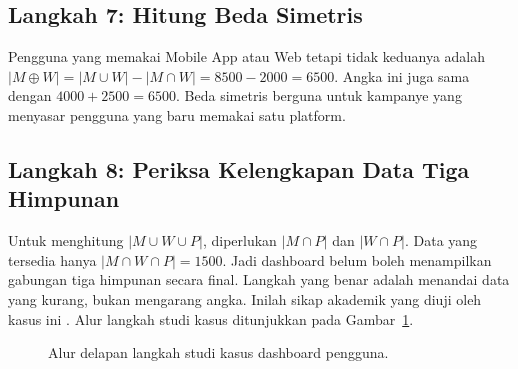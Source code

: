 \documentclass[11pt,a4paper]{article}
\begin{document}
\subsection{Langkah 7: Hitung Beda Simetris}

Pengguna yang memakai Mobile App atau Web tetapi tidak keduanya adalah $|M \oplus W|=|M \cup W|-|M \cap W|=8500-2000=6500$. Angka ini juga sama dengan $4000+2500=6500$. Beda simetris berguna untuk kampanye yang menyasar pengguna yang baru memakai satu platform.

\subsection{Langkah 8: Periksa Kelengkapan Data Tiga Himpunan}

Untuk menghitung $|M \cup W \cup P|$, diperlukan $|M \cap P|$ dan $|W \cap P|$. Data yang tersedia hanya $|M \cap W \cap P|=1500$. Jadi dashboard belum boleh menampilkan gabungan tiga himpunan secara final. Langkah yang benar adalah menandai data yang kurang, bukan mengarang angka. Inilah sikap akademik yang diuji oleh kasus ini \cite{silberschatz}. Alur langkah studi kasus ditunjukkan pada Gambar~\ref{fig:alur-studi-kasus}.

\begin{figure}[H]
	\centering
	\caption{Alur delapan langkah studi kasus dashboard pengguna.}
	\label{fig:alur-studi-kasus}
\end{figure}
\end{document}
